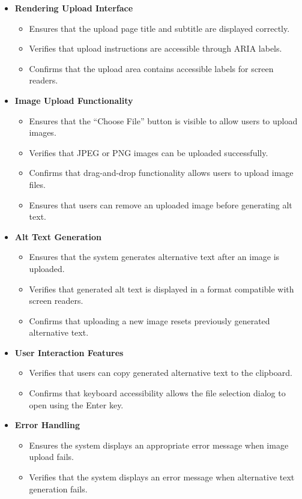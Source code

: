 \documentclass[12pt, titlepage]{article}
\begin{document}
\begin{itemize}

\item \textbf{Rendering Upload Interface}

\begin{itemize}
\item Ensures that the upload page title and subtitle are displayed correctly.
\item Verifies that upload instructions are accessible through ARIA labels.
\item Confirms that the upload area contains accessible labels for screen readers.
\end{itemize}

\item \textbf{Image Upload Functionality}

\begin{itemize}
\item Ensures that the ``Choose File'' button is visible to allow users to upload images.
\item Verifies that JPEG or PNG images can be uploaded successfully.
\item Confirms that drag-and-drop functionality allows users to upload image files.
\item Ensures that users can remove an uploaded image before generating alt text.
\end{itemize}

\item \textbf{Alt Text Generation}

\begin{itemize}
\item Ensures that the system generates alternative text after an image is uploaded.
\item Verifies that generated alt text is displayed in a format compatible with screen readers.
\item Confirms that uploading a new image resets previously generated alternative text.
\end{itemize}

\item \textbf{User Interaction Features}

\begin{itemize}
\item Verifies that users can copy generated alternative text to the clipboard.
\item Confirms that keyboard accessibility allows the file selection dialog to open using the Enter key.
\end{itemize}

\item \textbf{Error Handling}

\begin{itemize}
\item Ensures the system displays an appropriate error message when image upload fails.
\item Verifies that the system displays an error message when alternative text generation fails.
\end{itemize}

\end{itemize}
\end{document}

